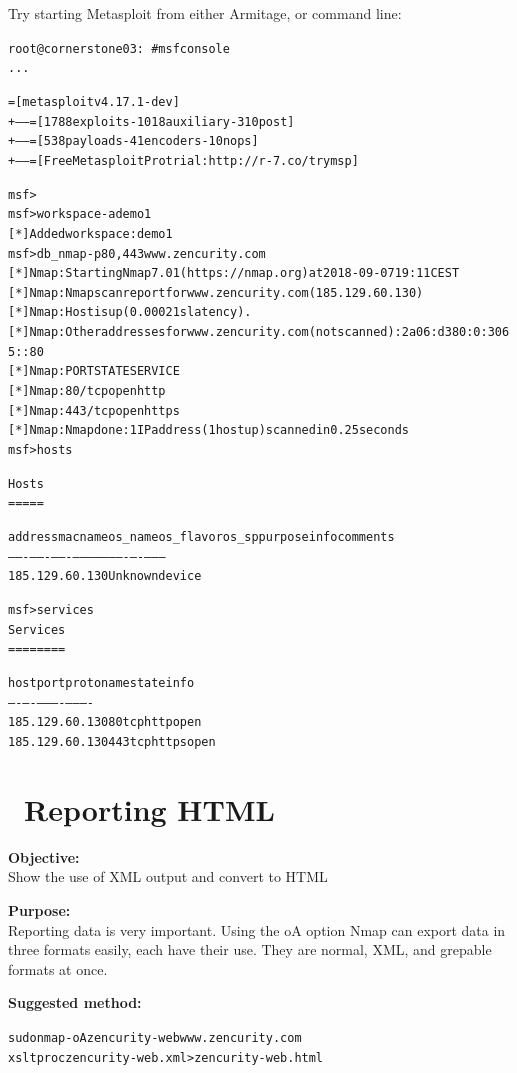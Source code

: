 \documentclass[a4paper,11pt,notitlepage]{report}
\begin{document}
Try starting Metasploit from either Armitage, or command line:
\begin{alltt}
root@cornerstone03:~# msfconsole
...

       =[ metasploit v4.17.1-dev                          ]
+ -- --=[ 1788 exploits - 1018 auxiliary - 310 post       ]
+ -- --=[ 538 payloads - 41 encoders - 10 nops            ]
+ -- --=[ Free Metasploit Pro trial: http://r-7.co/trymsp ]

msf >
msf > workspace -a demo1
[*] Added workspace: demo1
msf > db_nmap -p 80,443 www.zencurity.com
[*] Nmap: Starting Nmap 7.01 ( https://nmap.org ) at 2018-09-07 19:11 CEST
[*] Nmap: Nmap scan report for www.zencurity.com (185.129.60.130)
[*] Nmap: Host is up (0.00021s latency).
[*] Nmap: Other addresses for www.zencurity.com (not scanned): 2a06:d380:0:3065::80
[*] Nmap: PORT    STATE SERVICE
[*] Nmap: 80/tcp  open  http
[*] Nmap: 443/tcp open  https
[*] Nmap: Nmap done: 1 IP address (1 host up) scanned in 0.25 seconds
msf > hosts

Hosts
=====

address         mac  name  os_name  os_flavor  os_sp  purpose  info  comments
-------         ---  ----  -------  ---------  -----  -------  ----  --------
185.129.60.130             Unknown                    device

msf > services
Services
========

host            port  proto  name   state  info
----            ----  -----  ----   -----  ----
185.129.60.130  80    tcp    http   open
185.129.60.130  443   tcp    https  open
\end{alltt}

\chapter{\faInfoCircle\ Reporting HTML}
\label{ex:nmap-html}


{\bf Objective:} \\
Show the use of XML output and convert to HTML

{\bf Purpose:}\\
Reporting data is very important. Using the oA option Nmap can export data in three formats easily, each have their use. They are normal, XML, and grepable formats at once.

{\bf Suggested method:}\\
\begin{alltt}
  sudo nmap -oA zencurity-web www.zencurity.com
  xsltproc zencurity-web.xml > zencurity-web.html
\end{alltt}
\end{document}
